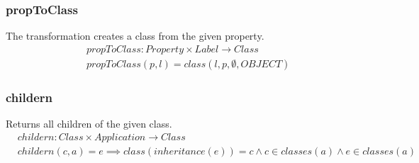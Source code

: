 \documentclass[10pt]{article}
\begin{document}
\subsubsection{propToClass}
The transformation creates a class from the given property.
\begin{align}
& propToClass: Property \times Label \rightarrow Class \\
& propToClass(p, l) = class(l, p, \emptyset, OBJECT)
\end{align}

\subsubsection{childern}
Returns all children of the given class.
\begin{align}
& childern : Class \times Application \rightarrow Class \\
& childern(c, a) = e \implies class(inheritance(e)) = c \land c \in classes(a) \land e \in classes(a)
\end{align}
\end{document}
